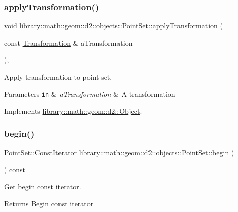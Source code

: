 \subsubsection{\texorpdfstring{apply\+Transformation()}{applyTransformation()}}
{\footnotesize\ttfamily void library\+::math\+::geom\+::d2\+::objects\+::\+Point\+Set\+::apply\+Transformation (\begin{DoxyParamCaption}\item[{const \hyperlink{classlibrary_1_1math_1_1geom_1_1d2_1_1_transformation}{Transformation} \&}]{a\+Transformation }\end{DoxyParamCaption})\hspace{0.3cm}{\ttfamily [override]}, {\ttfamily [virtual]}}



Apply transformation to point set. 


\begin{DoxyParams}[1]{Parameters}
\mbox{\tt in}  & {\em a\+Transformation} & A transformation \\
\hline
\end{DoxyParams}


Implements \hyperlink{classlibrary_1_1math_1_1geom_1_1d2_1_1_object_a289589fb6e9e7a2c4ca4976a1544def5}{library\+::math\+::geom\+::d2\+::\+Object}.

\mbox{\label{classlibrary_1_1math_1_1geom_1_1d2_1_1objects_1_1_point_set_ae7e4ce8100cde825aa0d3c5cc092eef9}} 
\subsubsection{\texorpdfstring{begin()}{begin()}}
{\footnotesize\ttfamily \hyperlink{classlibrary_1_1math_1_1geom_1_1d2_1_1objects_1_1_point_set_ad4c4f52fdc966f0d2031402edefc9e98}{Point\+Set\+::\+Const\+Iterator} library\+::math\+::geom\+::d2\+::objects\+::\+Point\+Set\+::begin (\begin{DoxyParamCaption}{ }\end{DoxyParamCaption}) const}



Get begin const iterator. 

\begin{DoxyReturn}{Returns}
Begin const iterator 
\end{DoxyReturn}
\mbox{\label{classlibrary_1_1math_1_1geom_1_1d2_1_1objects_1_1_point_set_ad867c4fb86734efe968a39c95eba53b3}} 
